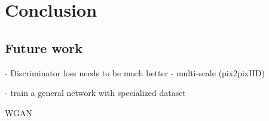 \chapter{Conclusion}
\section{Future work}
- Discriminator loss
needs to be much better
- multi-scale (pix2pixHD)

- train a general network with specialized dataset

WGAN
